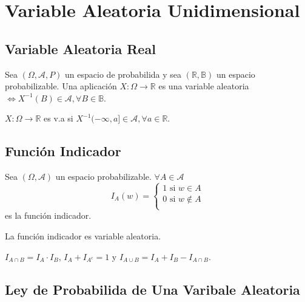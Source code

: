 \chapter{Variable Aleatoria Unidimensional}
\section{Variable Aleatoria Real}

\begin{defn}
  Sea $(\Omega, \mathcal{A}, P )$ un espacio de probabilida y sea $( \mathbb{R}, \mathbb{B})$ un espacio probabilizable. Una aplicación $X : \Omega \to \mathbb{R}$ es una variable aleatoria $\Leftrightarrow X^{-1}(B) \in \mathcal{A}, \forall B \in \mathbb{B}$.
\end{defn}

\begin{prop}
  $X :  \Omega \to \mathbb{R}$ es v.a si $X^{-1}(-\infty,a] \in \mathcal{A}, \forall a \in \mathbb{R}$.
\end{prop}

\section{Función Indicador}

\begin{defn}
  Sea $(\Omega, \mathcal{A})$ un espacio probabilizable. $\forall A \in \mathcal{A}$
  \[ 
    I_{A}(w) =
    \begin{cases}
      1 \text{ si } w \in A \\
      0 \text{ si } w \not \in A \\
    \end{cases} 
  \] 
  es la función indicador.
\end{defn}

\begin{obs}
  La función indicador es variable aleatoria.
\end{obs}

\begin{obs}
  $I_{A \cap B} = I_{A} \cdot I_{B}$, $I_{A} + I_{A^{c}} = 1$ y $I_{A \cup B} = I_{A} + I_{B} - I_{A \cap B}$.
\end{obs}

\section{Ley de Probabilida de Una Varibale Aleatoria}

